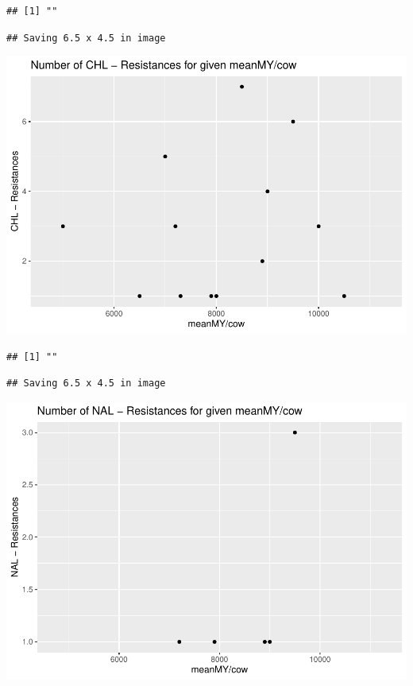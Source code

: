 \documentclass[
]{article}
\begin{document}
\begin{verbatim}
## [1] ""
\end{verbatim}

\begin{verbatim}
## Saving 6.5 x 4.5 in image
\end{verbatim}

\includegraphics{NResistenzen_files/figure-latex/numerical_variables-6.pdf}

\begin{verbatim}
## [1] ""
\end{verbatim}

\begin{verbatim}
## Saving 6.5 x 4.5 in image
\end{verbatim}

\includegraphics{NResistenzen_files/figure-latex/numerical_variables-7.pdf}
\end{document}
